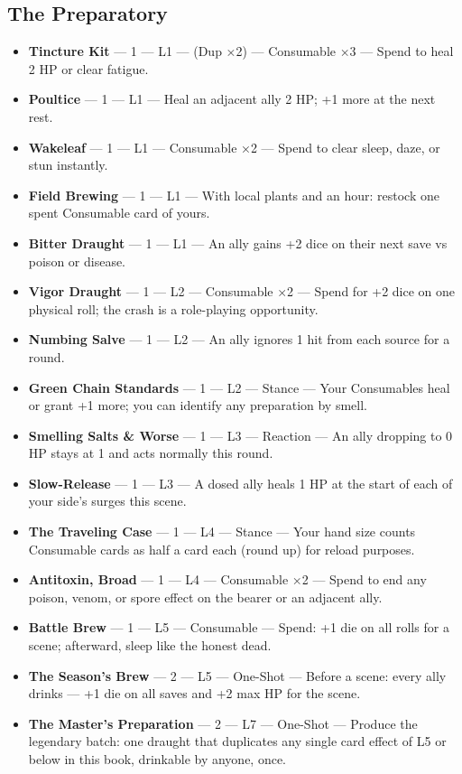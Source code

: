 \subsection{The Preparatory}
\begin{itemize}
    \item \textbf{Tincture Kit} --- 1 --- L1 --- (Dup ×2) --- Consumable ×3 --- Spend to heal 2 HP or clear fatigue.
    \item \textbf{Poultice} --- 1 --- L1 --- Heal an adjacent ally 2 HP; +1 more at the next rest.
    \item \textbf{Wakeleaf} --- 1 --- L1 --- Consumable ×2 --- Spend to clear sleep, daze, or stun instantly.
    \item \textbf{Field Brewing} --- 1 --- L1 --- With local plants and an hour: restock one spent Consumable card of yours.
    \item \textbf{Bitter Draught} --- 1 --- L1 --- An ally gains +2 dice on their next save vs poison or disease.
    \item \textbf{Vigor Draught} --- 1 --- L2 --- Consumable ×2 --- Spend for +2 dice on one physical roll; the crash is a role-playing opportunity.
    \item \textbf{Numbing Salve} --- 1 --- L2 --- An ally ignores 1 hit from each source for a round.
    \item \textbf{Green Chain Standards} --- 1 --- L2 --- Stance --- Your Consumables heal or grant +1 more; you can identify any preparation by smell.
    \item \textbf{Smelling Salts \& Worse} --- 1 --- L3 --- Reaction --- An ally dropping to 0 HP stays at 1 and acts normally this round.
    \item \textbf{Slow-Release} --- 1 --- L3 --- A dosed ally heals 1 HP at the start of each of your side's surges this scene.
    \item \textbf{The Traveling Case} --- 1 --- L4 --- Stance --- Your hand size counts Consumable cards as half a card each (round up) for reload purposes.
    \item \textbf{Antitoxin, Broad} --- 1 --- L4 --- Consumable ×2 --- Spend to end any poison, venom, or spore effect on the bearer or an adjacent ally.
    \item \textbf{Battle Brew} --- 1 --- L5 --- Consumable --- Spend: +1 die on all rolls for a scene; afterward, sleep like the honest dead.
    \item \textbf{The Season's Brew} --- 2 --- L5 --- One-Shot --- Before a scene: every ally drinks --- +1 die on all saves and +2 max HP for the scene.
    \item \textbf{The Master's Preparation} --- 2 --- L7 --- One-Shot --- Produce the legendary batch: one draught that duplicates any single card effect of L5 or below in this book, drinkable by anyone, once.
\end{itemize}

